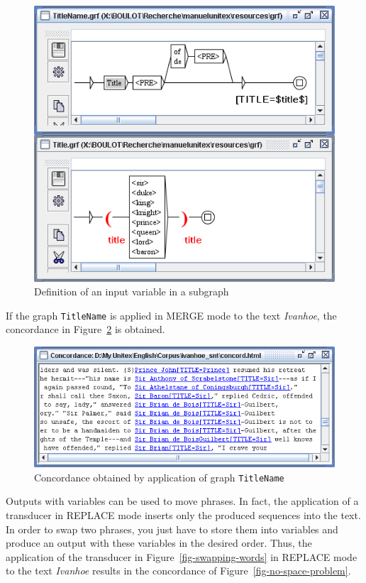 \begin{figure}[!p]
\begin{center}
\includegraphics[width=12cm]{resources/img/fig6-25.png}
\caption{Definition of an input variable in a subgraph\label{fig-variable-definition}}
\end{center}
\end{figure}

\bigskip
\noindent If the graph \verb+TitleName+ is applied in MERGE mode to the text
\textit{Ivanhoe}, the concordance in Figure~\ref{fig6-14} is obtained.

\begin{figure}[!p]
\begin{center}
\includegraphics[width=13.5cm]{resources/img/fig6-26.png}
\caption{Concordance obtained by application of graph \texttt{TitleName}\label{fig6-14}}
\end{center}
\end{figure}

\bigskip
\noindent Outputs with variables can be used to move phrases. In
fact, the application of a transducer in REPLACE mode inserts only the produced sequences
into the text. In order to swap two phrases, you just have to
store them into variables and produce an output with these variables in the
desired order. Thus, the application of the transducer in
Figure~\ref{fig-swapping-words} in REPLACE mode to the text \textit{Ivanhoe}
results in the concordance of
Figure~\ref{fig-no-space-problem}.

